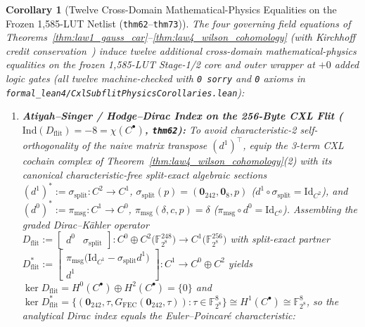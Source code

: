 \documentclass[11pt,letterpaper]{article}
\theoremstyle{spectralthm}
\newtheorem{corollary}[theorem]{Corollary}
\begin{document}
\begin{corollary}[Twelve Cross-Domain Mathematical-Physics Equalities on the Frozen 1,585-LUT Netlist (\texttt{thm62}--\texttt{thm73})]
\label{cor:six_cross_domain_physics}
The four governing field equations of Theorems~\ref{thm:law1_gauss_car}--\ref{thm:law4_wilson_cohomology} (with Kirchhoff credit conservation~\cite{kirchhoff1847ueber}) induce twelve additional cross-domain mathematical-physics equalities on the frozen 1,585-LUT Stage-1/2 core and outer wrapper at $+0$ added logic gates (all twelve machine-checked with \texttt{0 sorry} and \texttt{0} axioms in \texttt{formal\_lean4/CxlSubflitPhysicsCorollaries.lean}):
\begin{enumerate}[leftmargin=1.4em,label=\textup{(\roman*)},topsep=2pt,itemsep=1.5pt]
  \item \textbf{Atiyah--Singer / Hodge--Dirac Index on the 256-Byte CXL Flit ($\mathrm{Ind}(D_{\mathrm{flit}}) = -8 = \chi(C^\bullet)$, \texttt{thm62}):} To avoid characteristic-2 self-orthogonality of the naive matrix transpose $(d^1)^\top$, equip the 3-term CXL cochain complex of Theorem~\ref{thm:law4_wilson_cohomology}(2) with its canonical characteristic-free split-exact algebraic sections $(d^1)^* := \sigma_{\mathrm{split}} : C^2 \to C^1$, $\sigma_{\mathrm{split}}(p) = (\mathbf{0}_{242}, \mathbf{0}_8, p)$ ($d^1 \circ \sigma_{\mathrm{split}} = \mathrm{Id}_{C^2}$), and $(d^0)^* := \pi_{\mathrm{msg}} : C^1 \to C^0$, $\pi_{\mathrm{msg}}(\delta,c,p) = \delta$ ($\pi_{\mathrm{msg}} \circ d^0 = \mathrm{Id}_{C^0}$). Assembling the graded Dirac--K\"{a}hler operator~\cite{atiyah1968index, kahler1962innerer} $D_{\mathrm{flit}} := \begin{bmatrix} d^0 & \sigma_{\mathrm{split}} \end{bmatrix} : C^0 \oplus C^2 \bigl(\mathbb{F}_{2^8}^{248}\bigr) \to C^1\bigl(\mathbb{F}_{2^8}^{256}\bigr)$ with split-exact partner $D_{\mathrm{flit}}^* := \begin{bmatrix} \pi_{\mathrm{msg}}\bigl(\mathrm{Id}_{C^1} - \sigma_{\mathrm{split}} d^1\bigr) \\ d^1 \end{bmatrix} : C^1 \to C^0 \oplus C^2$ yields $\ker D_{\mathrm{flit}} = H^0(C^\bullet) \oplus H^2(C^\bullet) = \{0\}$ and $\ker D_{\mathrm{flit}}^* = \{(\mathbf{0}_{242}, \tau, G_{\mathrm{FEC}}(\mathbf{0}_{242},\tau)) : \tau \in \mathbb{F}_{2^8}^8\} \cong H^1(C^\bullet) \cong \mathbb{F}_{2^8}^8$, so the analytical Dirac index equals the Euler--Poincar\'{e} characteristic:
  \begin{equation}

\end{equation}
\end{enumerate}
\end{corollary}
\end{document}
